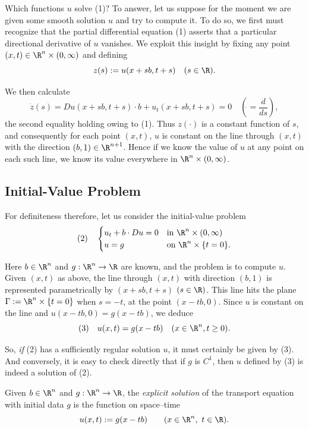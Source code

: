 Which functions $u$ solve (1)? To answer, let us suppose for the moment we are given some smooth solution $u$ and try to compute it. To do so, we first must recognize that the partial differential equation (1) asserts that a particular directional derivative of $u$ vanishes. We exploit this insight by fixing any point $(x,t) \in \R^n \times (0,\infty)$ and defining
$$z(s) := u(x+sb, t+s) \quad (s \in \R).$$

We then calculate
$$\dot{z}(s) = Du(x+sb,t+s) \cdot b + u_t(x+sb,t+s) = 0 \quad \left(\dot{} = \frac{d}{ds}\right),$$
the second equality holding owing to (1). Thus $z(\cdot)$ is a constant function of $s$, and consequently for each point $(x,t)$, $u$ is constant on the line through $(x,t)$ with the direction $(b,1) \in \R^{n+1}$. Hence if we know the value of $u$ at any point on each such line, we know its value everywhere in $\R^n \times (0,\infty)$.

\subsection{Initial-Value Problem}
\label{sec:transport-equation-initial-value-problem}

For definiteness therefore, let us consider the initial-value problem
$$(2) \quad \begin{cases} u_t + b \cdot Du = 0 & \text{in } \R^n \times (0,\infty) \\ u = g & \text{on } \R^n \times \{t = 0\}. \end{cases}$$

Here $b \in \R^n$ and $g : \R^n \to \R$ are known, and the problem is to compute $u$. Given $(x,t)$ as above, the line through $(x,t)$ with direction $(b,1)$ is represented parametrically by $(x+sb,t+s)$ $(s \in \R)$. This line hits the plane $\Gamma := \R^n \times \{t=0\}$ when $s = -t$, at the point $(x-tb,0)$. Since $u$ is constant on the line and $u(x-tb,0) = g(x-tb)$, we deduce
$$(3) \quad u(x,t) = g(x-tb) \quad (x \in \R^n, t \geq 0).$$

So, \textit{if} (2) has a sufficiently regular solution $u$, it must certainly be given by (3). And conversely, it is easy to check directly that if $g$ is $C^1$, then $u$ defined by (3) is indeed a solution of (2).

\begin{definition}
\label{def:transport-explicit-solution}
\leanok
Given $b \in \R^n$ and $g : \R^n \to \R$, the \textit{explicit solution} of the
transport equation with initial data $g$ is the function on space--time
$$u(x,t) := g(x - tb) \qquad (x \in \R^n,\ t \in \R).$$
\end{definition}

